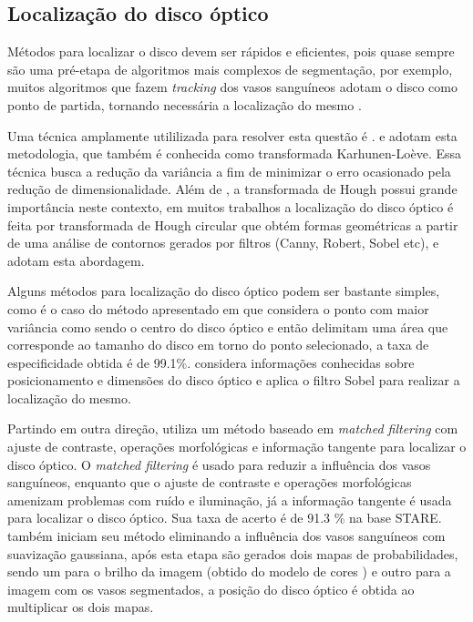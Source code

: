 \subsection{Localização do disco óptico}

Métodos para localizar o disco devem ser rápidos e eficientes, pois quase sempre são uma pré-etapa de algoritmos mais complexos de segmentação, por exemplo, muitos algoritmos que fazem \textit{tracking} dos vasos sanguíneos adotam o disco como ponto de partida, tornando necessária a localização do mesmo \cite{Mookiah2013a}. 

Uma técnica amplamente utililizada para resolver esta questão é  .   e  adotam esta metodologia, que também é conhecida como transformada Karhunen-Loève. Essa técnica busca a redução da variância a fim de minimizar o erro ocasionado pela redução de dimensionalidade. Além de , a transformada de Hough possui grande importância neste contexto, em muitos trabalhos a localização do disco óptico é feita por transformada de Hough circular que obtém formas geométricas a partir de uma análise de contornos gerados por filtros (Canny, Robert, Sobel etc), 
 e  adotam esta abordagem. 


Alguns métodos para localização do disco óptico podem ser bastante simples, como é o caso do método apresentado em  que considera o ponto com maior variância como sendo o centro do disco óptico e então delimitam uma área  que corresponde ao tamanho do disco em torno do ponto selecionado, a taxa de especificidade obtida é de 99.1\%.  considera informações conhecidas sobre posicionamento e dimensões do disco óptico e aplica o filtro Sobel para realizar a localização do mesmo. 

Partindo em outra direção,  utiliza um método baseado em \textit{matched filtering} com ajuste de contraste, operações morfológicas e informação tangente para localizar o disco óptico. O \textit{matched filtering} é usado para reduzir a influência dos vasos sanguíneos, enquanto que o ajuste de contraste e operações morfológicas amenizam problemas com ruído e iluminação, já a informação tangente é usada para localizar o disco óptico. Sua taxa de acerto é de  91.3 \% na base  STARE.
 também iniciam seu método eliminando a influência dos vasos sanguíneos com suavização gaussiana, após esta etapa são gerados dois mapas de probabilidades, sendo um para o brilho da imagem (obtido do modelo de cores ) e outro para a imagem com os vasos  segmentados, a posição do disco óptico é obtida ao multiplicar os dois mapas. 

